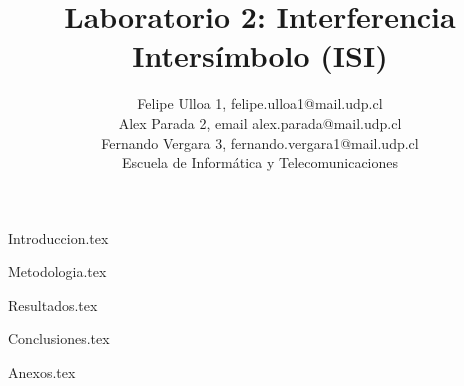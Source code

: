 \documentclass[lettersize,journal]{IEEEtran}
\begin{document}
\title{Laboratorio 2: Interferencia Intersímbolo (ISI)}

\author{Felipe Ulloa 1, felipe.ulloa1@mail.udp.cl \\
Alex Parada 2, email alex.parada@mail.udp.cl \\
Fernando Vergara 3, fernando.vergara1@mail.udp.cl \\

Escuela de Informática y Telecomunicaciones \\ 
}



\maketitle

{Introduccion.tex}

{Metodologia.tex}

{Resultados.tex}

{Conclusiones.tex}

\onecolumn
{Anexos.tex}


\nocite{IEEEhowto:kopka}


\end{document}
